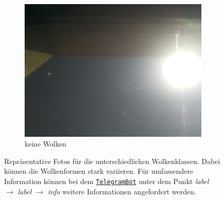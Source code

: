 \begin{figure}[h]
\begin{subfigure}[b]{0.31\textwidth}
		\end{subfigure}
		\begin{subfigure}[b]{0.31\textwidth}
		\begin{center}
				\includegraphics[width=\textwidth]{./pictures/cloudtypes/no_clouds.pdf}
		\end{center}
		\caption{keine Wolken}
		\label{fig:no_clouds}
		\end{subfigure}
		\caption{Repräsentative Fotos für die unterschiedlichen Wolkenklassen.
		Dabei können die Wolkenformen stark variieren. Für umfassendere
		Information können bei dem
		\href{https://telegram.me/weatherpi_bot}{\texttt{TelegramBot}} unter dem
		Punkt \textit{label $\rightarrow$ label $\rightarrow$ info} weitere 
		Informationen angefordert werden.}
		\label{fig:classes}
\end{figure}
